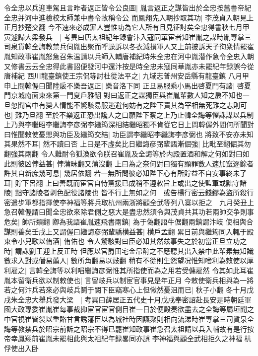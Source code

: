 令全忠以兵迎車駕且言昨者返正皆令公良圖|{
	胤言返正之謀皆出於全忠按舊書帝紀全忠并河中進檢校太師兼中書令故稱令公}
而鳳翔先入朝抄取其功|{
	李茂貞入朝見上正月抄楚交翻}
今不速來必成罪人豈惟功為它人所有且見征討矣全忠得書秋七月甲寅遽歸大梁發兵　|{
	考異曰唐太祖紀年録會汴入寇同華宦者知崔胤之謀時胤專掌三司泉貨韓全誨教禁兵伺胤出聚而呼譟訴以冬衣減損軍人又上前披訴天子徇衆情罷崔胤知政事崔胤怒急召朱温請以兵師入輔唐補紀時朱全忠在河中胤潜作急令全忠入朝又修書云云全忠得此書詔便發河中還汴按是時全忠未寇同華胤亦未罷紀年録誤今從唐補紀}
西川龍臺鎮使王宗侃等討杜從法平之|{
	九域志普州安岳縣有龍臺鎮}
八月甲申上問韓偓曰聞陸扆不樂吾返正|{
	樂音洛下同}
正旦易服乘小馬出啓夏門有諸|{
	啓夏門京城南面東來第一門夏戶雅翻}
對曰返正之謀獨臣與崔胤輩數人知之扆不知也一旦忽聞宫中有變人情能不驚駭易服逃避何妨有之陛下責其為宰相無死難之志則可也|{
	難乃旦翻}
至於不樂返正恐出讒人之口願陛下察之上乃止韓全誨等懼誅謀以兵制上乃與李繼昭李繼誨李彦弼李繼筠深相結繼昭獨不肯從它日上問韓偓外間何所聞對曰惟聞敕使憂愳與功臣及繼筠交結|{
	功臣謂李繼昭李繼誨李彦弼也}
將致不安亦未知其果然不耳|{
	然不讀曰否}
上曰是不虛矣比日繼誨彦弼輩語漸倔強|{
	比毗至翻倔其勿翻強其兩翻}
令人難耐令狐渙欲令朕召崔胤及全誨等於内殿置酒和解之何如對曰如此則彼凶悖益甚|{
	悖蒲昧翻又蒲沒翻}
上曰為之奈何對曰獨有顯罪數人速加竄逐餘者許其自新庶幾可息|{
	幾居依翻}
若一無所問彼必知陛下心有所貯益不自安事終未了耳|{
	貯下呂翻}
上曰善既而宦官自恃黨援已成稍不遵敕旨上或出之使監軍或黜守諸陵|{
	黜守諸陵者剥色配役諸陵也}
皆不行上無如之何　或告楊行密云錢鏐為盜所殺行密遣步軍都指揮使李神福等將兵取杭州兩浙將顧全武等列八寨以拒之　九月癸丑上急召韓偓謂曰聞全忠欲來除君側之惡大是盡忠然須令與茂貞共其功若兩帥交争則事危矣|{
	帥所類翻}
卿為我語崔胤速飛書兩鎮|{
	為于偽翻語牛倨翻兩鎮謂汴岐}
使相與合謀則善矣壬戌上又謂偓曰繼誨彦弼輩驕横益甚|{
	横戶孟翻}
累日前與繼筠同入輒于殿東令小兒歌以侑酒|{
	侑佑也}
令人驚駭對曰臣必知其然兹事失之於初當正旦立功之時|{
	謂誅劉王迎上反正時}
但應以官爵田宅金帛酧之不應聽其出入禁中此輩素無知識數求入對或僭易薦人|{
	數所角翻易以䜴翻}
稍有不從則生怨望况惟知嗜利為敕使以厚利雇之|{
	言韓全誨等以利㗖繼誨彦弼惟其所指使而為之用若受傭雇然}
令其如此耳崔胤本留衛兵欲以制敕使也|{
	言留岐兵以制宦官事見是年正月}
今敕使衛兵相與為一將若之何汴兵若來必與岐兵鬭于闕下臣竊寒心上但愀然憂沮而已|{
	秋子小翻}
冬十月戊戌朱全忠大舉兵發大梁　|{
	考異曰薛居正五代史十月戊戌奉密詔赴長安是時朝廷軍國大政專委崔胤崔每事裁抑宦官宦官側目崔一日於便殿奏欲盡去之全誨等屬垣聞之中官視崔眥裂以重賂甘言誘藩臣以為城社時因讌聚則相向流涕時崔專掌三司貨泉全誨等教禁兵於昭宗前訴之昭宗不得已罷崔知政事崔急召太祖請以兵入輔故有是行按帝幸鳳翔前崔胤未罷相此與太祖紀年録畧同亦誤}
李神福與顧全武相拒久之神福杭俘使出入卧

